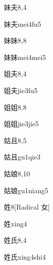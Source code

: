 \begin{entry}{妹夫}{8,4}
  \begin{phonetics}{妹夫}{mei4fu5}
  \end{phonetics}
\end{entry}

\begin{entry}{妹妹}{8,8}
  \begin{phonetics}{妹妹}{mei4mei5}
  \end{phonetics}
\end{entry}

\begin{entry}{姐夫}{8,4}
  \begin{phonetics}{姐夫}{jie3fu5}
  \end{phonetics}
\end{entry}

\begin{entry}{姐姐}{8,8}
  \begin{phonetics}{姐姐}{jie3jie5}
  \end{phonetics}
\end{entry}

\begin{entry}{姑且}{8,5}
  \begin{phonetics}{姑且}{gu1qie3}
  \end{phonetics}
\end{entry}

\begin{entry}{姑娘}{8,10}
  \begin{phonetics}{姑娘}{gu1niang5}
  \end{phonetics}
\end{entry}

\begin{entry}{姓}{8}[Radical 女]
  \begin{phonetics}{姓}{xing4}
  \end{phonetics}
\end{entry}

\begin{entry}{姓氏}{8,4}
  \begin{phonetics}{姓氏}{xing4shi4}
  \end{phonetics}
\end{entry}

